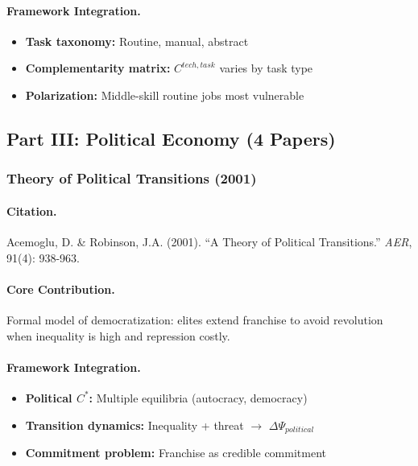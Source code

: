 \documentclass[12pt,a4paper]{article}
\begin{document}
\paragraph{Framework Integration.}
\begin{itemize}
  \item \textbf{Task taxonomy:} Routine, manual, abstract
  \item \textbf{Complementarity matrix:} $C^{tech,task}$ varies by task type
  \item \textbf{Polarization:} Middle-skill routine jobs most vulnerable
\end{itemize}

\subsection{Part III: Political Economy (4 Papers)}

\subsubsection{Theory of Political Transitions (2001)}

\paragraph{Citation.}
Acemoglu, D. \& Robinson, J.A. (2001).
``A Theory of Political Transitions.'' \emph{AER}, 91(4): 938-963.

\paragraph{Core Contribution.}
Formal model of democratization: elites extend franchise to avoid
revolution when inequality is high and repression costly.

\paragraph{Framework Integration.}
\begin{itemize}
  \item \textbf{Political $C^*$:} Multiple equilibria (autocracy, democracy)
  \item \textbf{Transition dynamics:} Inequality + threat $\to$ $\Delta\Psi_{political}$
  \item \textbf{Commitment problem:} Franchise as credible commitment
\end{itemize}

\end{document}
